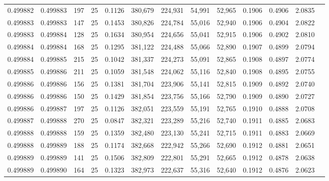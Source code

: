 \begin{tabular}{rrrrrrrrrrrrr}
0.499882 & 0.499883 & 197 &  25 &                                     0.1126 & 380,679 & 224,931 &  54,991 &  52,965 & 0.1906 & 0.4906 & 2.0835 \\
0.499883 & 0.499883 & 147 &  25 &                                     0.1453 & 380,826 & 224,784 &  55,016 &  52,940 & 0.1906 & 0.4904 & 2.0822 \\
0.499883 & 0.499884 & 128 &  25 &                                     0.1634 & 380,954 & 224,656 &  55,041 &  52,915 & 0.1906 & 0.4902 & 2.0810 \\
0.499884 & 0.499884 & 168 &  25 &                                     0.1295 & 381,122 & 224,488 &  55,066 &  52,890 & 0.1907 & 0.4899 & 2.0794 \\
0.499884 & 0.499885 & 215 &  25 &                                     0.1042 & 381,337 & 224,273 &  55,091 &  52,865 & 0.1908 & 0.4897 & 2.0774 \\
0.499885 & 0.499886 & 211 &  25 &                                     0.1059 & 381,548 & 224,062 &  55,116 &  52,840 & 0.1908 & 0.4895 & 2.0755 \\
0.499886 & 0.499886 & 156 &  25 &                                     0.1381 & 381,704 & 223,906 &  55,141 &  52,815 & 0.1909 & 0.4892 & 2.0740 \\
0.499886 & 0.499886 & 150 &  25 &                                     0.1429 & 381,854 & 223,756 &  55,166 &  52,790 & 0.1909 & 0.4890 & 2.0727 \\
0.499886 & 0.499887 & 197 &  25 &                                     0.1126 & 382,051 & 223,559 &  55,191 &  52,765 & 0.1910 & 0.4888 & 2.0708 \\
0.499887 & 0.499888 & 270 &  25 &                                     0.0847 & 382,321 & 223,289 &  55,216 &  52,740 & 0.1911 & 0.4885 & 2.0683 \\
0.499888 & 0.499888 & 159 &  25 &                                     0.1359 & 382,480 & 223,130 &  55,241 &  52,715 & 0.1911 & 0.4883 & 2.0669 \\
0.499888 & 0.499889 & 188 &  25 &                                     0.1174 & 382,668 & 222,942 &  55,266 &  52,690 & 0.1912 & 0.4881 & 2.0651 \\
0.499889 & 0.499889 & 141 &  25 &                                     0.1506 & 382,809 & 222,801 &  55,291 &  52,665 & 0.1912 & 0.4878 & 2.0638 \\
0.499889 & 0.499890 & 164 &  25 &                                     0.1323 & 382,973 & 222,637 &  55,316 &  52,640 & 0.1912 & 0.4876 & 2.0623 \\

\end{tabular}
